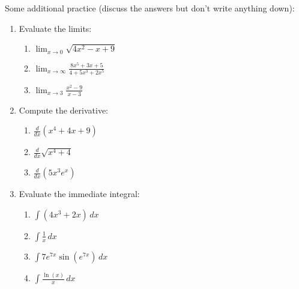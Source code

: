 \documentclass[12pt]{article}
\newcommand{\di}{\displaystyle}
\begin{document}
Some additional practice (discuss the answers but don't write anything down):
\begin{enumerate}
\item Evaluate the limits:
\begin{multicols}{3}
\begin{enumerate}
\item $\di \lim_{x\to 0}\sqrt{4x^2-x+9}$
\item $\di \lim_{x\to \infty}\frac{8x^5+3x+5}{4+5x^3+2x^5}$
\item $\di \lim_{x\to 3}\frac{x^2-9}{x-3}$ 
\end{enumerate}
\end{multicols}

\item Compute the derivative:
\begin{multicols}{3}
\begin{enumerate}
\item $\di\frac{d}{dx}(x^4+4x+9)$
\item $\di \frac{d}{dx}\sqrt{x^4+4}$
\item $\di\frac{d}{dx}(5x^3e^x)$
\end{enumerate}
\end{multicols}

\item Evaluate the immediate integral:
\begin{multicols}{2}
\begin{enumerate}
\item $\di \int(4x^3+2x)\,dx$
\item $\di \int\frac{1}{x}\,dx$
\item $\di \int 7e^{7x}\sin(e^{7x})\,dx$
\item $\di \int \frac{\ln(x)}{x}\,dx$
\end{enumerate}
\end{multicols}
\end{enumerate}




\newpage

\end{document}
